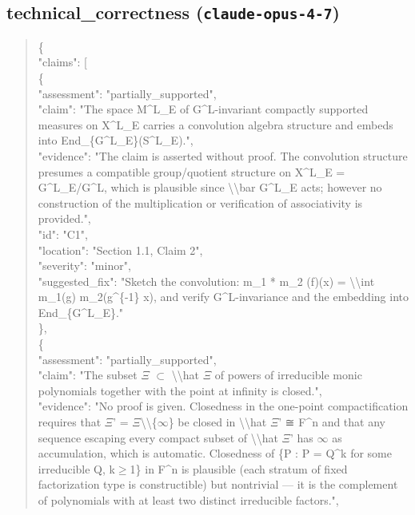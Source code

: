\documentclass[11pt]{article}
\begin{document}
\subsection*{technical\_correctness (\texttt{claude-opus-4-7})}
\begin{quote}\small\ttfamily\raggedright
\{\\
  "claims": [\\
    \{\\
      "assessment": "partially\_supported",\\
      "claim": "The space M\^{}L\_E of G\^{}L-invariant compactly supported measures on X\^{}L\_E carries a convolution algebra structure and embeds into End\_\{G\^{}L\_E\}(S\^{}L\_E).",\\
      "evidence": "The claim is asserted without proof. The convolution structure presumes a compatible group/quotient structure on X\^{}L\_E = G\^{}L\_E/G\^{}L, which is plausible since \textbackslash{}\textbackslash{}bar G\^{}L\_E acts; however no construction of the multiplication or verification of associativity is provided.",\\
      "id": "C1",\\
      "location": "Section 1.1, Claim 2",\\
      "severity": "minor",\\
      "suggested\_fix": "Sketch the convolution: m\_1 * m\_2 (f)(x) = \textbackslash{}\textbackslash{}int m\_1(g) m\_2(g\^{}\{-1\} x), and verify G\^{}L-invariance and the embedding into End\_\{G\^{}L\_E\}."\\
    \},\\
    \{\\
      "assessment": "partially\_supported",\\
      "claim": "The subset \ensuremath{\Xi} \ensuremath{\subset} \textbackslash{}\textbackslash{}hat \ensuremath{\Xi} of powers of irreducible monic polynomials together with the point at infinity is closed.",\\
      "evidence": "No proof is given. Closedness in the one-point compactification requires that \ensuremath{\Xi}' = \ensuremath{\Xi}\textbackslash{}\textbackslash{}\{\ensuremath{\infty}\} be closed in \textbackslash{}\textbackslash{}hat \ensuremath{\Xi}' ≅ F\^{}n and that any sequence escaping every compact subset of \textbackslash{}\textbackslash{}hat \ensuremath{\Xi}' has \ensuremath{\infty} as accumulation, which is automatic. Closedness of \{P : P = Q\^{}k for some irreducible Q, k\ensuremath{\ge}1\} in F\^{}n is plausible (each stratum of fixed factorization type is constructible) but nontrivial --- it is the complement of polynomials with at least two distinct irreducible factors.",\\

\end{quote}
\end{document}

